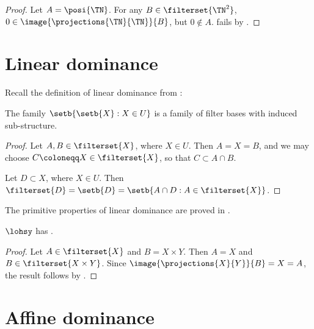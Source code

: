 \documentclass[b5paper, english, oneside]{memoir}
\begin{document}
\begin{proof}
Let $A = \posi{\TN}$. For any $B \in \filterset{\TN^2}$, $0 \in \image{\projections{\TN}{\TN}}{B}$, but $0 \not\in A$.  fails by .
\end{proof}

\section{Linear dominance}
\label{LinearDominance}

Recall the definition of linear dominance from :

\begin{theorem}
\label{LinearDominanceIsLocalLinearDominance}
The family $\setb{\setb{X} : X \in U}$ is a family of filter bases with induced sub-structure.
\end{theorem}

\begin{proof}
Let $A, B \in \filterset{X}$, where $X \in U$. Then $A = X = B$, and we may choose $C \coloneqq X \in \filterset{X}$, so that $C \subset A \cap B$. 

Let $D \subset X$, where $X \in U$. Then $\filterset{D} = \setb{D} = \setb{A \cap D : A \in \filterset{X}}$.
\end{proof}

\begin{note}[]
The primitive properties of linear dominance are proved in .
\end{note}

\begin{theorem}
\label{LinearExtensibility}
$\lohsy$ has .
\end{theorem}

\begin{proof}
Let $A \in \filterset{X}$ and $B = X \times Y$. Then $A = X$ and $B \in \filterset{X \times Y}$. Since $\image{\projections{X}{Y}}{B} = X = A$, the result follows by . 
\end{proof}

\section{Affine dominance}
\label{AffineDominance}
\end{document}
